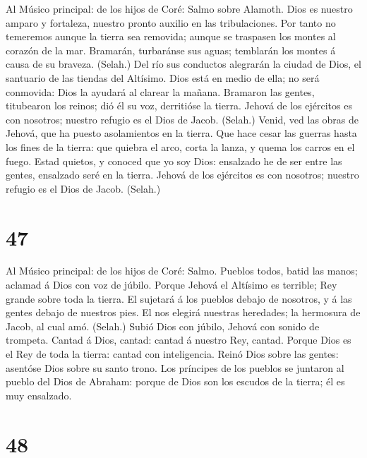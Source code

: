  Al Músico principal: de los hijos de Coré: Salmo sobre
Alamoth. Dios es nuestro amparo y fortaleza, nuestro pronto auxilio en
las tribulaciones.  Por tanto no temeremos aunque la
tierra sea removida; aunque se traspasen los montes al corazón de la
mar.  Bramarán, turbaránse sus aguas; temblarán los montes
á causa de su braveza. (Selah.)  Del río sus conductos
alegrarán la ciudad de Dios, el santuario de las tiendas del Altísimo.
 Dios está en medio de ella; no será conmovida: Dios la
ayudará al clarear la mañana.  Bramaron las gentes,
titubearon los reinos; dió él su voz, derritióse la tierra.
 Jehová de los ejércitos es con nosotros; nuestro refugio
es el Dios de Jacob. (Selah.)  Venid, ved las obras de
Jehová, que ha puesto asolamientos en la tierra.  Que hace
cesar las guerras hasta los fines de la tierra: que quiebra el arco,
corta la lanza, y quema los carros en el fuego.  Estad
quietos, y conoced que yo soy Dios: ensalzado he de ser entre las
gentes, ensalzado seré en la tierra.  Jehová de los
ejércitos es con nosotros; nuestro refugio es el Dios de Jacob. (Selah.)

\hypertarget{section-46}{%
\section{47}\label{section-46}}

 Al Músico principal: de los hijos de Coré: Salmo. Pueblos
todos, batid las manos; aclamad á Dios con voz de júbilo. 
Porque Jehová el Altísimo es terrible; Rey grande sobre toda la tierra.
 El sujetará á los pueblos debajo de nosotros, y á las
gentes debajo de nuestros pies.  El nos elegirá nuestras
heredades; la hermosura de Jacob, al cual amó. (Selah.) 
Subió Dios con júbilo, Jehová con sonido de trompeta. 
Cantad á Dios, cantad: cantad á nuestro Rey, cantad. 
Porque Dios es el Rey de toda la tierra: cantad con inteligencia.
 Reinó Dios sobre las gentes: asentóse Dios sobre su santo
trono.  Los príncipes de los pueblos se juntaron al pueblo
del Dios de Abraham: porque de Dios son los escudos de la tierra; él es
muy ensalzado.

\hypertarget{section-47}{%
\section{48}\label{section-47}}

